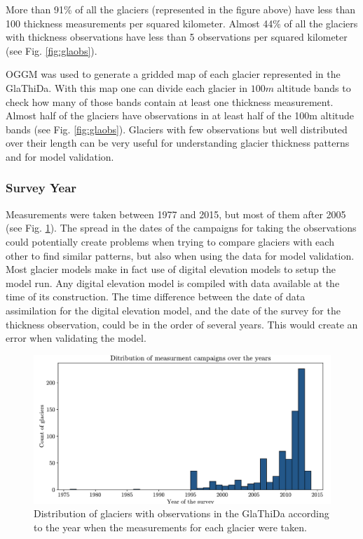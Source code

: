 More than 91\% of all the glaciers (represented in the figure above) have less than 100 thickness measurements per squared kilometer. Almost 44\% of all the glaciers with thickness observations have less than 5 observations per squared kilometer (see Fig. \ref{fig:glaobs}).

OGGM was used to generate a gridded map of each glacier represented in the GlaThiDa. With this map one can divide each glacier in $100m$ altitude bands to check how many of those bands contain at least one thickness measurement.
Almost half of the glaciers have observations in at least half of the 100m altitude bands (see Fig. \ref{fig:glaobs}). Glaciers with few observations but well distributed over their length can be very useful for understanding glacier thickness patterns and for model validation.

\subsubsection{Survey Year}
Measurements were taken between 1977 and 2015, but most of them after 2005 (see Fig. \ref{fig:glayears}). The spread in the dates of the campaigns for taking the observations could potentially create problems when trying to compare glaciers with each other to find similar patterns, but also when using the data for model validation.
Most glacier models make in fact use of digital elevation models to setup the model run. Any digital elevation model is compiled with data available at the time of its construction. The time difference between the date of data assimilation for the digital elevation model, and the date of the survey for the thickness observation, could be in the order of several years. This would create an error when validating the model.
\begin{figure}[!tp]
	\centering		  
	\includegraphics[width=1.\textwidth]{figures/Observations_per_year.pdf}
	\caption{Distribution of glaciers with observations in the GlaThiDa according to the year when the measurements for each glacier were taken.}
	\label{fig:glayears}
\end{figure}


